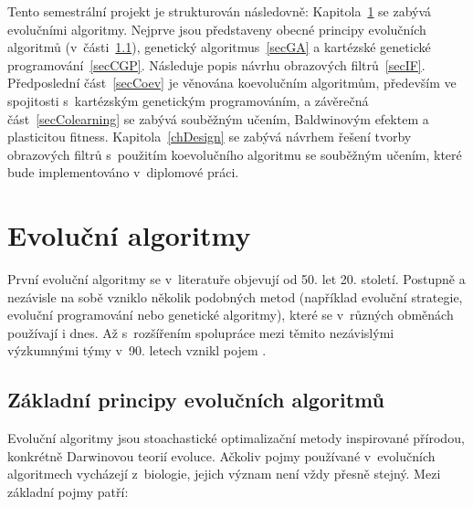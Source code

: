 Tento semestrální projekt je strukturován následovně: Kapitola~\ref{chEA} se zabývá evolučními algoritmy. Nejprve jsou představeny obecné principy evolučních algoritmů (v~části~\ref{secEAGeneral}), genetický algoritmus~\ref{secGA} a kartézské genetické programování~\ref{secCGP}. Následuje popis návrhu obrazových filtrů~\ref{secIF}. Předposlední část~\ref{secCoev} je věnována koevolučním algoritmům, především ve spojitosti s~kartézským genetickým programováním, a závěrečná část~\ref{secColearning} se zabývá souběžným učením, Baldwinovým efektem a plasticitou fitness. Kapitola~\ref{chDesign} se zabývá návrhem řešení tvorby obrazových filtrů s~použitím koevolučního algoritmu se souběžným učením, které bude implementováno v~diplomové práci.

\chapter{Evoluční algoritmy}
\label{chEA}

První evoluční algoritmy se v~literatuře objevují od 50. let 20. století. Postupně a nezávisle na sobě vzniklo několik podobných metod (například evoluční strategie, evoluční programování nebo genetické algoritmy), které se v~různých obměnách používají i dnes. Až s~rozšířením spolupráce mezi těmito nezávislými výzkumnými týmy v~90. letech vznikl pojem  \cite{Modra}.

\section{Základní principy evolučních algoritmů}
\label{secEAGeneral}

Evoluční algoritmy jsou stoachastické optimalizační metody inspirované přírodou, konkrétně Darwinovou teorií evoluce. Ačkoliv pojmy používané v~evolučních algoritmech vycházejí z~biologie, jejich význam není vždy přesně stejný. Mezi základní pojmy patří:

